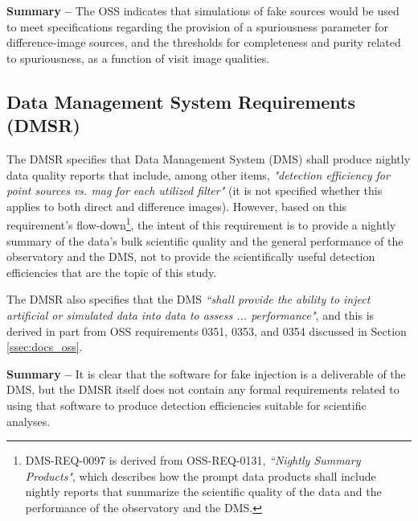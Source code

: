 \documentclass[DM,lsstdraft,toc]{lsstdoc}
\begin{document}
{\bf Summary --} The OSS indicates that simulations of fake sources would be used to meet specifications regarding the provision of a spuriousness parameter for difference-image sources, and the thresholds for completeness and purity related to spuriousness, as a function of visit image qualities. 



\subsection{Data Management System Requirements (DMSR)}\label{ssec:docs_dmsr}

The DMSR  specifies that Data Management System (DMS) shall produce nightly data quality reports that include, among other items, {\it "detection efficiency for point sources vs. mag for each utilized filter"} (it is not specified whether this applies to both direct and difference images). However, based on this requirement's flow-down\footnote{DMS-REQ-0097 is derived from OSS-REQ-0131, {\it ``Nightly Summary Products"}, which describes how the prompt data products shall include nightly reports that summarize the scientific quality of the data and the performance of the observatory and the DMS.}, the intent of this requirement is to provide a nightly summary of the data's bulk scientific quality and the general performance of the observatory and the DMS, not to provide the scientifically useful detection efficiencies that are the topic of this study. 

The DMSR also specifies that the DMS {\it ``shall provide the ability to inject artificial or simulated data into data to assess ... performance"}, and this is derived in part from OSS requirements 0351, 0353, and 0354 discussed in Section \ref{ssec:docs_oss}.

{\bf Summary --} It is clear that the software for fake injection is a deliverable of the DMS, but the DMSR itself does not contain any formal requirements related to using that software to produce detection efficiencies suitable for scientific analyses. 
\end{document}
